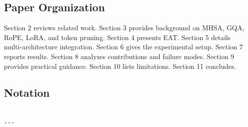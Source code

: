 \subsection{Paper Organization}

Section 2 reviews related work. Section 3 provides background on MHSA, GQA, 
RoPE, LoRA, and token pruning. Section 4 presents EAT. Section 5 details 
multi-architecture integration. Section 6 gives the experimental setup. 
Section 7 reports results. Section 8 analyzes contributions and failure 
modes. Section 9 provides practical guidance. Section 10 lists limitations. 
Section 11 concludes.



\subsection{Notation}

\begin{lstlisting}

---
\end{lstlisting}